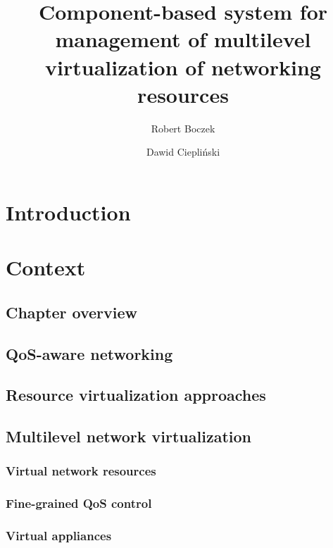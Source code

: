 \documentclass[11pt]{book}
\title{Component-based system for management of multilevel virtualization of networking resources}
\author{Robert Boczek \and Dawid Ciepliński}
\begin{document}
  \maketitle
    
  \tableofcontents


  \chapter{Introduction}



  \chapter{Context}  %

    \section*{Chapter overview}


    \section{QoS-aware networking}



    \section{Resource virtualization approaches}


    \section{Multilevel network virtualization}

      \subsection{Virtual network resources}

      \subsection{Fine-grained QoS control}

      \subsection{Virtual appliances}
\end{document}
